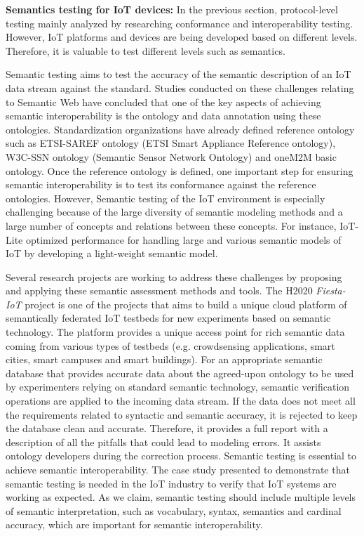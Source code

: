 \textbf{Semantics testing for IoT devices:} In the previous section, protocol-level testing mainly analyzed by researching conformance and interoperability testing. However, IoT platforms and devices are being developed based on different levels. Therefore, it is valuable to test different levels such as semantics.

Semantic testing aims to test the accuracy of the semantic description of an IoT data stream against the standard. Studies conducted on these challenges relating to Semantic Web have concluded that one of the key aspects of achieving semantic interoperability is the ontology and data annotation using these ontologies. Standardization organizations have already defined reference ontology such as ETSI-SAREF ontology (ETSI Smart Appliance Reference ontology), W3C-SSN ontology (Semantic Sensor Network Ontology) and oneM2M basic ontology. Once the reference ontology is defined, one important step for ensuring semantic interoperability is to test its conformance against the reference ontologies. However, Semantic testing of the IoT environment is especially challenging because of the large diversity of semantic modeling methods and a large number of concepts and relations between these concepts. For instance, IoT-Lite optimized performance for handling large and various semantic models of IoT by developing a light-weight semantic model. 

Several research projects are working to address these challenges by proposing and applying these semantic assessment methods and tools. The H2020 \textit{Fiesta-IoT} project is one of the projects that aims to build a unique cloud platform of semantically federated IoT testbeds for new experiments based on semantic technology. The platform provides a unique access point for rich semantic data coming from various types of testbeds (e.g. crowdsensing applications, smart cities, smart campuses and smart buildings). For an appropriate semantic database that provides accurate data about the agreed-upon ontology to be used by experimenters relying on standard semantic technology, semantic verification operations are applied to the incoming data stream. If the data does not meet all the requirements related to syntactic and semantic accuracy, it is rejected to keep the database clean and accurate. Therefore, it provides a full report with a description of all the pitfalls that could lead to modeling errors. It assists ontology developers during the correction process. Semantic testing is essential to achieve semantic interoperability. The case study presented to demonstrate that semantic testing is needed in the IoT industry to verify that IoT systems are working as expected. As we claim, semantic testing should include multiple levels of semantic interpretation, such as vocabulary, syntax, semantics and cardinal accuracy, which are important for semantic interoperability.

